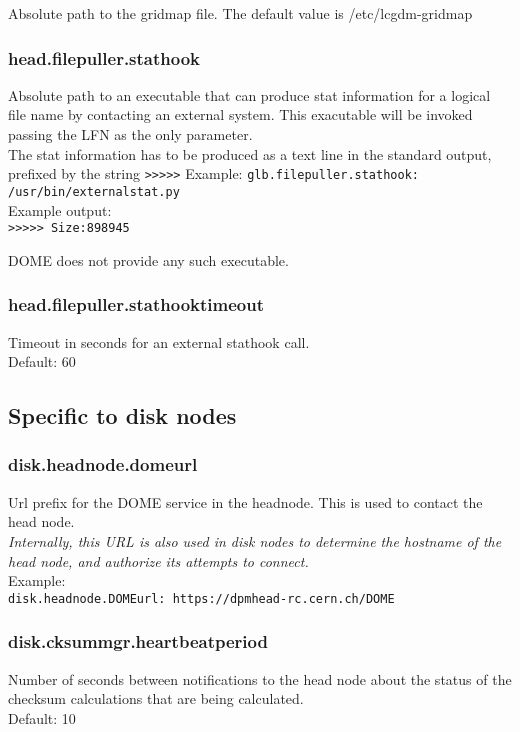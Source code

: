 \documentclass[a4paper,10pt]{scrreprt}
\begin{document}
Absolute path to the gridmap file. The default value is /etc/lcgdm-gridmap

\subsubsection{head.filepuller.stathook}

Absolute path to an executable that can produce stat information for a logical file name by contacting an external system. This exacutable
will be invoked passing the LFN as the only parameter.\\
The stat information has to be produced as a text line in the standard output, prefixed by the string \lstinline">>>>>"
Example:
\lstinline"glb.filepuller.stathook: /usr/bin/externalstat.py"\\
Example output:\\
\lstinline">>>>> Size:898945"

DOME does not provide any such executable.\\

\subsubsection{head.filepuller.stathooktimeout}
Timeout in seconds for an external stathook call.\\
Default: 60\\

\subsection{Specific to disk nodes}

\subsubsection{disk.headnode.domeurl}
Url prefix for the DOME service in the headnode. This is used to contact the head node.\\

\textit{Internally, this URL is also used in disk nodes to determine the hostname of the head node, and authorize its attempts to connect.}\\

Example:\\
\lstinline"disk.headnode.DOMEurl: https://dpmhead-rc.cern.ch/DOME"\\

\subsubsection{disk.cksummgr.heartbeatperiod}
Number of seconds between notifications to the head node about the status of the checksum calculations that are being calculated.\\
Default: 10\\
\end{document}
